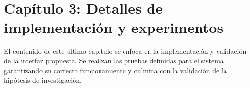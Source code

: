 
\section*{Capítulo 3: Detalles de implementación y experimentos}

El contenido de este último capítulo se enfoca en la implementación y validación de la interfaz propuesta. Se realizan las pruebas definidas para el sistema garantizando su correcto funcionamiento y culmina con la validación de la hipótesis de investigación.




%
%
%
